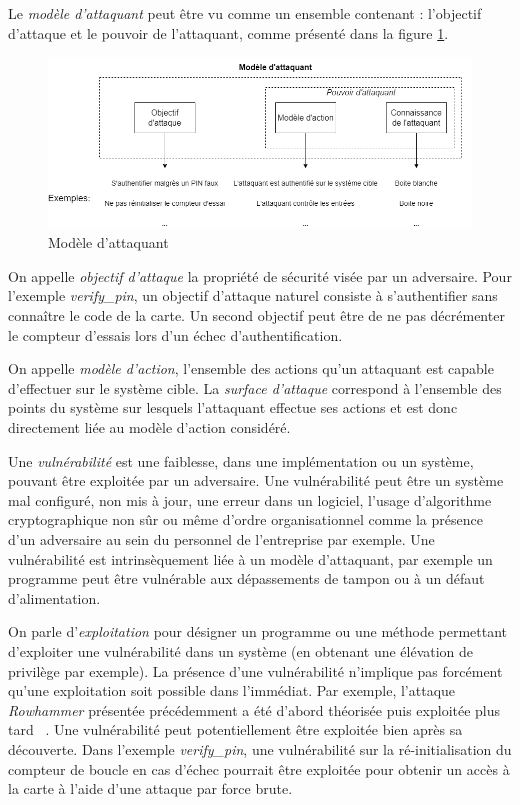         Le \textit{modèle d'attaquant} peut être vu comme un ensemble contenant : l'objectif d'attaque et le pouvoir de l'attaquant, comme présenté dans la figure \ref{fig:attacker-model}.
        
        \begin{figure}[!ht]\centering
            \includegraphics[width=\textwidth]{ch1-context/img/attack-model.png}
            \caption{Modèle d'attaquant}  \label{fig:attacker-model}
        \end{figure}
        
        On appelle \textit{objectif d'attaque} la propriété de sécurité visée par un adversaire. Pour l'exemple \textit{verify\_pin}, un objectif d'attaque naturel consiste à s'authentifier sans connaître le code de la carte. Un second objectif peut être de ne pas décrémenter le compteur d'essais lors d'un échec d'authentification. 
        
        On appelle \textit{modèle d'action}, l'ensemble des actions qu'un attaquant est capable d'effectuer sur le système cible. La \textit{surface d'attaque} correspond à l'ensemble des points du système sur lesquels l'attaquant effectue ses actions et est donc directement liée au modèle d'action considéré.
        
        Une \textit{vulnérabilité} est une faiblesse, dans une implémentation ou un système, pouvant être exploitée par un adversaire. Une vulnérabilité peut être un système mal configuré, non mis à jour, une erreur dans un logiciel, l'usage d'algorithme cryptographique non sûr ou même d'ordre organisationnel comme la présence d'un adversaire au sein du personnel de l'entreprise par exemple. Une vulnérabilité est intrinsèquement liée à un modèle d'attaquant, par exemple un programme peut être vulnérable aux dépassements de tampon ou à un défaut d'alimentation.
        
        On parle d'\textit{exploitation} pour désigner un programme ou une méthode permettant d'exploiter une vulnérabilité dans un système (en obtenant une élévation de privilège par exemple). La présence d'une vulnérabilité n'implique pas forcément qu'une exploitation soit possible dans l'immédiat. Par exemple, l'attaque \textit{Rowhammer} présentée précédemment a été d'abord théorisée \cite{Kim/ACM14} puis exploitée plus tard ~\cite{Seaborn/BH15,Gruss/DIMVA16}. Une vulnérabilité peut potentiellement être exploitée bien après sa découverte. Dans l'exemple \textit{verify\_pin}, une vulnérabilité sur la ré-initialisation du compteur de boucle en cas d'échec pourrait être exploitée pour obtenir un accès à la carte à l'aide d'une attaque par force brute.
        
